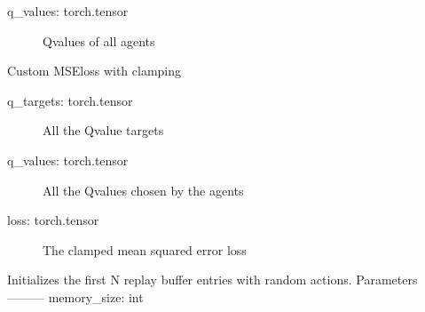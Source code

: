 \documentclass[letterpaper,10pt,english]{sphinxmanual}
\begin{document}
\begin{fulllineitems}
\begin{fulllineitems}
\begin{description}
\end{description}
\begin{description}
\item[{q\_values: torch.tensor}] \leavevmode
\sphinxAtStartPar
Q\sphinxhyphen{}values of all agents

\end{description}

\end{fulllineitems}


\begin{fulllineitems}
\label{\detokenize{MultiAgentMarketRL:trainer.DeepQTrainer.mse_loss}}
\sphinxAtStartPar
Custom MSE\sphinxhyphen{}loss with clamping
\begin{description}
\item[{q\_targets: torch.tensor}] \leavevmode
\sphinxAtStartPar
All the Q\sphinxhyphen{}value targets

\item[{q\_values: torch.tensor}] \leavevmode
\sphinxAtStartPar
All the Q\sphinxhyphen{}values chosen by the agents

\end{description}
\begin{description}
\item[{loss: torch.tensor}] \leavevmode
\sphinxAtStartPar
The clamped mean squared error loss

\end{description}

\end{fulllineitems}


\begin{fulllineitems}
\label{\detokenize{MultiAgentMarketRL:trainer.DeepQTrainer.set_replay_buffer}}
\sphinxAtStartPar
Initializes the first N replay buffer entries with random actions.
Parameters
———\sphinxhyphen{}
memory\_size: int
\begin{quote}


\end{quote}
\end{fulllineitems}
\end{fulllineitems}
\end{document}
